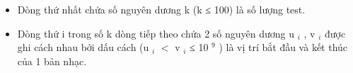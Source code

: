 \begin{itemize}
	\item Dòng thứ nhất chứa số nguyên dương k (k ≤ 100) là số lượng test.
	\item Dòng thứ i trong số k dòng tiếp theo chứa 2 số nguyên dương u $_ i $ , v $_ i $ được ghi cách nhau bởi dấu cách (u $_ i $ $<$ v $_ i $ ≤ 10 $^ 9 $ ) là vị trí bắt đầu và kết thúc của 1 bản nhạc.
\end{itemize}

\